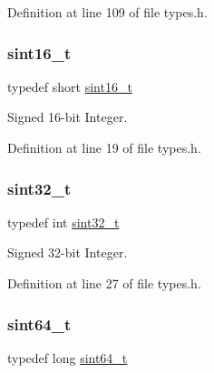 Definition at line 109 of file types.\+h.

\mbox{\label{a00140_a5881659ed80e940350d12831204375cd_a5881659ed80e940350d12831204375cd}} 
\subsubsection{\texorpdfstring{sint16\+\_\+t}{sint16\_t}}
{\footnotesize\ttfamily typedef short \hyperlink{a00140_a5881659ed80e940350d12831204375cd_a5881659ed80e940350d12831204375cd}{sint16\+\_\+t}}



Signed 16-\/bit Integer. 



Definition at line 19 of file types.\+h.

\mbox{\label{a00140_ad838970452fe561cb8e0550cac5336be_ad838970452fe561cb8e0550cac5336be}} 
\subsubsection{\texorpdfstring{sint32\+\_\+t}{sint32\_t}}
{\footnotesize\ttfamily typedef int \hyperlink{a00140_ad838970452fe561cb8e0550cac5336be_ad838970452fe561cb8e0550cac5336be}{sint32\+\_\+t}}



Signed 32-\/bit Integer. 



Definition at line 27 of file types.\+h.

\mbox{\label{a00140_a04761b9e7480e1e48b0d392da17fd5d4_a04761b9e7480e1e48b0d392da17fd5d4}} 
\subsubsection{\texorpdfstring{sint64\+\_\+t}{sint64\_t}}
{\footnotesize\ttfamily typedef long \hyperlink{a00140_a04761b9e7480e1e48b0d392da17fd5d4_a04761b9e7480e1e48b0d392da17fd5d4}{sint64\+\_\+t}}



